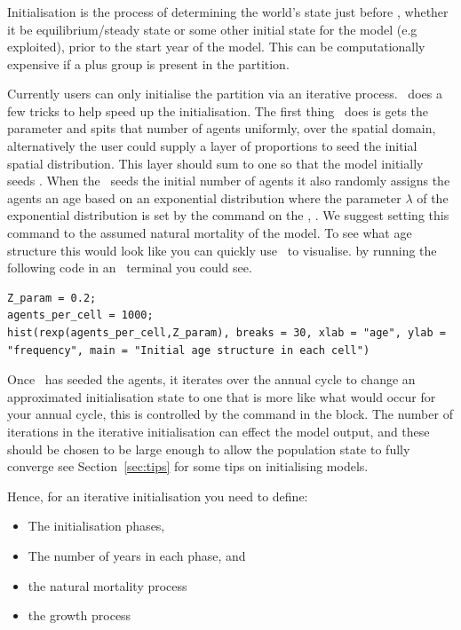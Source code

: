 \subsubsection{}\label{subsec:initialisation}
Initialisation is the process of determining the world's state just before , whether it be equilibrium/steady state or some other initial state for the model (e.g exploited), prior to the start year of the model. This can be computationally expensive if a plus group is present in the partition.

Currently users can only initialise the partition via an iterative process. \IBM\ does a few tricks to help speed up the initialisation. The first thing \IBM\ does is gets the parameter  and spits that number of agents uniformly, over the spatial domain, alternatively the user could supply a layer  of proportions to seed the initial spatial distribution. This layer should sum to one so that the model initially seeds . When the \IBM\ seeds the initial number of agents it also randomly assigns the agents an age based on an exponential distribution where the parameter $\lambda$ of the exponential distribution is set by the command on the , . We suggest setting this command to the assumed natural mortality of the model. To see what age structure this would look like you can quickly use \R\ to visualise. by running the following code in an \R\ terminal you could see.

\begin{lstlisting}
Z_param = 0.2;
agents_per_cell = 1000;
hist(rexp(agents_per_cell,Z_param), breaks = 30, xlab = "age", ylab = "frequency", main = "Initial age structure in each cell")
\end{lstlisting}

Once \IBM\ has seeded the agents, it iterates over the annual cycle to change an approximated initialisation state to one that is more like what would occur for your annual cycle, this is controlled by the  command in the  block. The number of iterations in the iterative initialisation can effect the model output, and these should be chosen to be large enough to allow the population state to fully converge see Section~\ref{sec:tips} for some tips on initialising models.

Hence, for an iterative initialisation you need to define:
\begin{itemize}
  \item The initialisation phases,
  \item The number of years in each phase, and
  \item the natural mortality process
  \item the growth process
\end{itemize}


